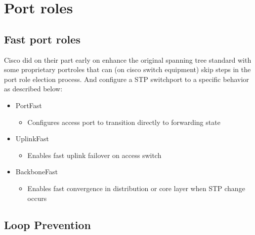 
\section{Port roles}

\subsection{Fast port roles}
Cisco did on their part early on enhance the original spanning tree standard with some proprietary portroles that can (on cisco switch equipment) skip steps in the port role election process. And configure a STP switchport to a specific behavior as described below:

\begin{itemize}
 \item PortFast
    \begin{itemize}
        \item Configures access port to transition directly to forwarding state
    \end{itemize}
 \item UplinkFast
    \begin{itemize}
        \item Enables fast uplink failover on access switch
    \end{itemize}
 \item BackboneFast
    \begin{itemize}
        \item Enables fast convergence in distribution or core layer when STP change occurs
    \end{itemize}
\end{itemize}

\subsection{Loop Prevention}

